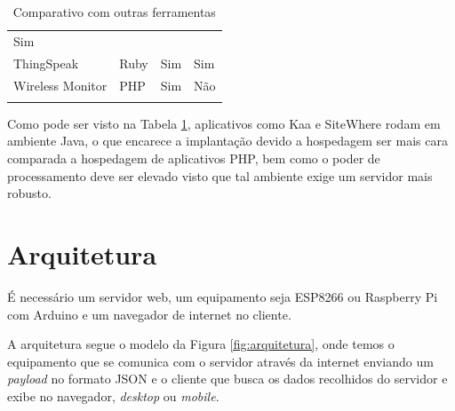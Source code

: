 \begin{longtable}[c]{@{}llll@{}}
\begin{minipage}[t]{0.12\columnwidth}
Sim
\end{minipage}
\\\addlinespace
\begin{minipage}[t]{0.22\columnwidth}\raggedright
ThingSpeak
\end{minipage} & \begin{minipage}[t]{0.28\columnwidth}\raggedright
Ruby
\end{minipage} & \begin{minipage}[t]{0.25\columnwidth}\raggedright
Sim
\end{minipage} & \begin{minipage}[t]{0.12\columnwidth}\raggedright
Sim
\end{minipage}
\\\addlinespace
\begin{minipage}[t]{0.22\columnwidth}\raggedright
Wireless Monitor
\end{minipage} & \begin{minipage}[t]{0.28\columnwidth}\raggedright
PHP
\end{minipage} & \begin{minipage}[t]{0.25\columnwidth}\raggedright
Sim
\end{minipage} & \begin{minipage}[t]{0.12\columnwidth}\raggedright
Não
\end{minipage}
\\\addlinespace
\bottomrule
\addlinespace
\caption{Comparativo com outras ferramentas \label{tab:comparativo}}
\end{longtable}

Como pode ser visto na Tabela \ref{tab:comparativo}, aplicativos como
Kaa e SiteWhere rodam em ambiente Java, o que encarece a implantação
devido a hospedagem ser mais cara comparada a hospedagem de aplicativos
PHP, bem como o poder de processamento deve ser elevado visto que tal
ambiente exige um servidor mais robusto.

\section{Arquitetura}\label{arquitetura}

É necessário um servidor web, um equipamento \iot seja ESP8266 ou
Raspberry Pi com Arduino e um navegador de internet no cliente.

A arquitetura segue o modelo da Figura \ref{fig:arquitetura}, onde temos
o equipamento \iot que se comunica com o servidor através da internet
enviando um \emph{payload} no formato JSON e o cliente que busca os
dados recolhidos do servidor e exibe no navegador, \emph{desktop} ou
\emph{mobile}.

